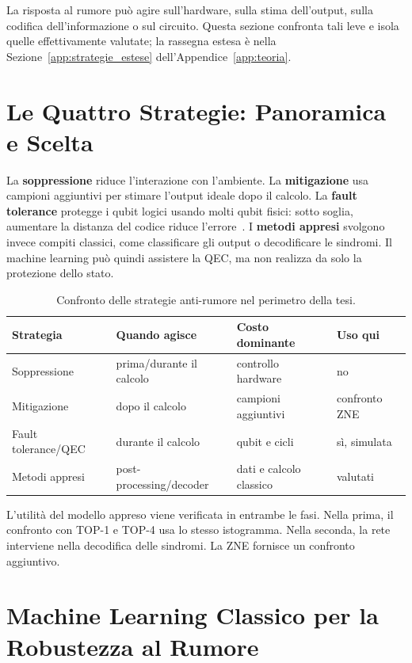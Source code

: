 \begin{onehalfspace}

La risposta al rumore può agire sull'hardware, sulla stima dell'output, sulla
codifica dell'informazione o sul circuito. Questa sezione confronta tali leve e
isola quelle effettivamente valutate; la rassegna estesa è nella
Sezione~\ref{app:strategie_estese} dell'Appendice~\ref{app:teoria}.

\section{Le Quattro Strategie: Panoramica e Scelta}

La \textbf{soppressione} riduce l'interazione con l'ambiente. La \textbf{mitigazione} usa campioni aggiuntivi per stimare l'output ideale dopo il calcolo. La \textbf{fault tolerance} protegge i qubit logici usando molti qubit fisici: sotto soglia, aumentare la distanza del codice riduce l'errore~\cite{aharonov1997fault}. I \textbf{metodi appresi} svolgono invece compiti classici, come classificare gli output o decodificare le sindromi. Il machine learning può quindi assistere la \ac{QEC}, ma non realizza da solo la protezione dello stato.

\begin{table}[H]
\centering
\small
\begin{tabular}{@{}llll@{}}
\toprule
\textbf{Strategia} & \textbf{Quando agisce} & \textbf{Costo dominante} & \textbf{Uso qui} \\
\midrule
Soppressione & prima/durante il calcolo & controllo hardware & no \\
Mitigazione & dopo il calcolo & campioni aggiuntivi & confronto ZNE \\
Fault tolerance/QEC & durante il calcolo & qubit e cicli & sì, simulata \\
Metodi appresi & post-processing/decoder & dati e calcolo classico & valutati \\
\bottomrule
\end{tabular}
\caption{Confronto delle strategie anti-rumore nel perimetro della tesi.}
\label{tab:strategie_confronto}
\end{table}

L'utilità del modello appreso viene verificata in entrambe le fasi. Nella prima, il confronto con TOP-1 e TOP-4 usa lo stesso istogramma. Nella seconda, la rete interviene nella decodifica delle sindromi. La \ac{ZNE} fornisce un confronto aggiuntivo.

\section{Machine Learning Classico per la Robustezza al Rumore}
\label{sec:qml_overview}


\end{onehalfspace}
